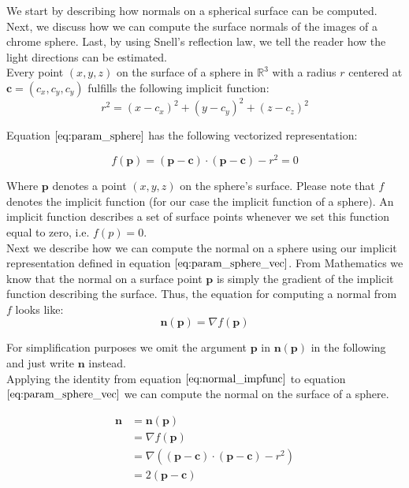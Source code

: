 \documentclass{paper}
\begin{document}
We start by describing how normals on a spherical surface can be computed. Next, we discuss how we can compute the surface normals of the images of a chrome sphere. Last, by using Snell's reflection law, we tell the reader how the light directions can be estimated. \\

Every point $(x,y,z)$ on the surface of a sphere in $\mathbb{R}^3$ with a radius $r$ centered at $\textbf{c} = (c_x, c_y, c_y)$ fulfills the following implicit function:
\begin{equation}
    r^2 = (x-c_{x})^2 + (y-c_{y})^2 + (z-c_{z})^2
\label{eq:param_sphere}
\end{equation}

Equation $\ref{eq:param_sphere}$ has the following vectorized representation:

\begin{equation}
    f(\textbf{p}) = (\textbf{p}-\textbf{c}) \cdot (\textbf{p}-\textbf{c}) -r^2 = 0
\label{eq:param_sphere_vec}
\end{equation}

Where $\textbf{p}$ denotes a point $(x,y,z)$ on the sphere's surface. Please note that $f$ denotes the implicit function (for our case the implicit function of a sphere). An implicit function describes a set of surface points whenever we set this function equal to zero, i.e. $f(p) = 0$. \\

Next we describe how we can compute the normal on a sphere using our implicit representation defined in equation $\ref{eq:param_sphere_vec}$. From Mathematics we know that the normal on a surface point $\textbf{p}$ is simply the gradient of the implicit function describing the surface. Thus, the equation for computing a normal from $f$ looks like:
\begin{equation}
     	\textbf{n}(\textbf{p}) = \nabla f(\textbf{p})
\label{eq:normal_impfunc}
\end{equation}

For simplification purposes we omit the argument $\textbf{p}$ in $\textbf{n}(\textbf{p})$ in the following and just write $\textbf{n}$ instead. \\

Applying the identity from equation $\ref{eq:normal_impfunc}$ to equation $\ref{eq:param_sphere_vec}$ we can compute the normal on the surface of a sphere.

\begin{align}
\textbf{n}
&= \textbf{n}(\textbf{p}) \nonumber \\
&= \nabla f(\textbf{p})  \nonumber \\
&= \nabla \left((\textbf{p}-\textbf{c}) \cdot (\textbf{p}-\textbf{c}) -r^2\right) \nonumber \\
&= 2(\textbf{p}-\textbf{c})
\label{eq:impl_sphere_normal}
\end{align}
\end{document}
